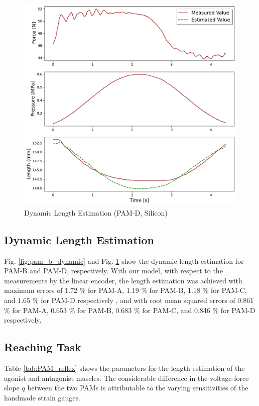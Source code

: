 \begin{figure}[h]
\begin{center}
\begin{minipage}[t]{\columnwidth}
           \includegraphics[keepaspectratio, width=\columnwidth]{fig/20231220_2_s_by_2_2d_ieeesensors2.pdf}
           \caption{Dynamic Length Estimation (PAM-D, Silicon)}
           \label{fig:pam_d_dynamic}
       \end{minipage}
   \end{center}
\end{figure}

\subsection{Dynamic Length Estimation} 
Fig. \ref{fig:pam_b_dynamic} and Fig. \ref{fig:pam_d_dynamic} show the dynamic length estimation for PAM-B and PAM-D, respectively.
With our model, with respect to the measurements by the linear encoder, the length estimation was achieved with maximum errors of 1.72 $\%$ for PAM-A, 1.19 $\%$ for PAM-B, 1.18 $\%$ for PAM-C, and  1.65 $\%$ for PAM-D respectively , and with root mean squared errors of 0.861 $\%$ for PAM-A, 0.653 $\%$ for PAM-B, 0.683 $\%$ for PAM-C, and 0.846 $\%$ for PAM-D respectively.

\subsection{Reaching Task}
Table \ref{tab:PAM_reflex} shows the parameters for the length estimation of the agonist and antagonist muscles. The considerable difference in the voltage-force slope $q$ between the two PAMs is attributable to the varying sensitivities of the handmade strain gauges.

